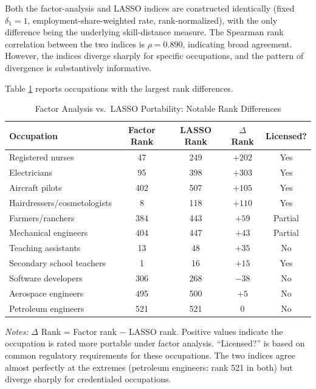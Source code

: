 \documentclass[12pt]{article}
\begin{document}
Both the factor-analysis and LASSO indices are constructed identically (fixed $\delta_1 = 1$, employment-share-weighted rate, rank-normalized), with the only difference being the underlying skill-distance measure. The Spearman rank correlation between the two indices is $\rho = 0.890$, indicating broad agreement. However, the indices diverge sharply for specific occupations, and the pattern of divergence is substantively informative.

Table \ref{tab:factor_lasso} reports occupations with the largest rank differences.

\begin{table}[H]
\centering
\caption{Factor Analysis vs.\ LASSO Portability: Notable Rank Differences}
\label{tab:factor_lasso}
\begin{tabular}{lcccc}
\toprule
\textbf{Occupation} & \textbf{Factor Rank} & \textbf{LASSO Rank} & \textbf{$\Delta$ Rank} & \textbf{Licensed?} \\
\midrule
Registered nurses             & 47  & 249 & $+202$ & Yes \\
Electricians                  & 95  & 398 & $+303$ & Yes \\
Aircraft pilots               & 402 & 507 & $+105$ & Yes \\
Hairdressers/cosmetologists   & 8   & 118 & $+110$ & Yes \\
Farmers/ranchers              & 384 & 443 & $+59$  & Partial \\
Mechanical engineers          & 404 & 447 & $+43$  & Partial \\
Teaching assistants            & 13  & 48  & $+35$  & No \\
Secondary school teachers     & 1   & 16  & $+15$  & Yes \\
Software developers           & 306 & 268 & $-38$  & No \\
Aerospace engineers           & 495 & 500 & $+5$   & No \\
Petroleum engineers           & 521 & 521 & $0$    & No \\
\bottomrule
\end{tabular}
\begin{minipage}{0.9\textwidth}
\vspace{0.5em}
\footnotesize \textit{Notes:} $\Delta$ Rank = Factor rank $-$ LASSO rank. Positive values indicate the occupation is rated more portable under factor analysis. ``Licensed?'' is based on common regulatory requirements for these occupations. The two indices agree almost perfectly at the extremes (petroleum engineers: rank 521 in both) but diverge sharply for credentialed occupations.
\end{minipage}
\end{table}
\end{document}
